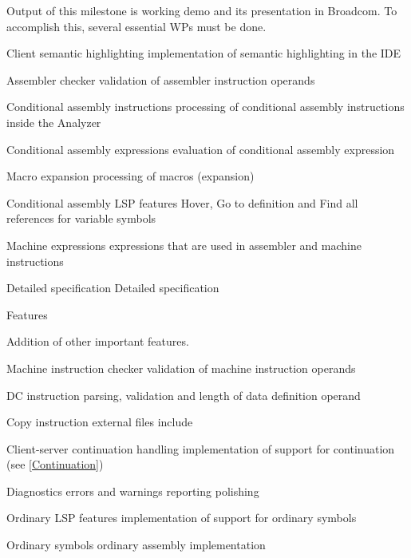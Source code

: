 		\small Output of this milestone is working demo and its presentation in Broadcom. To accomplish this, several essential WPs must be done.
		
		\bwp
			\itemwp Client semantic highlighting 
					\tiny implementation of semantic highlighting in the IDE
					
			\itemwp Assembler checker 
					\tiny validation of assembler instruction operands
					
			\itemwp Conditional assembly instructions 
					\tiny processing of conditional assembly instructions inside the Analyzer
					
			\itemwp Conditional assembly expressions 
					\tiny evaluation of conditional assembly expression 
					
			\itemwp Macro expansion 
					\tiny processing of macros (expansion)
					
			\itemwp Conditional assembly LSP features 
					\tiny Hover, Go to definition and Find all references for variable symbols
					
			\itemwp Machine expressions 
					\tiny expressions that are used in assembler and machine instructions
		\eenum
	
	
	\itemm Detailed specification 
		\bwp
			\itemwp Detailed specification 
		\eenum
	
	
	\itemm Features 
	
		\small Addition of other important features.
		
		\bwp
			\itemwp Machine instruction checker 
					\tiny validation of machine instruction operands
					
			\itemwp DC instruction 
					\tiny parsing, validation and length of data definition operand
					
			\itemwp Copy instruction 
					\tiny external files include
					
			\itemwp Client-server continuation handling 
					\tiny implementation of support for continuation (see \cref{Continuation})
			
			\itemwp Diagnostics 
					\tiny errors and warnings reporting polishing
					
			\itemwp Ordinary LSP features 
					\tiny implementation of support for ordinary symbols
					
			\itemwp Ordinary symbols 
					\tiny ordinary assembly implementation
		\eenum
		
